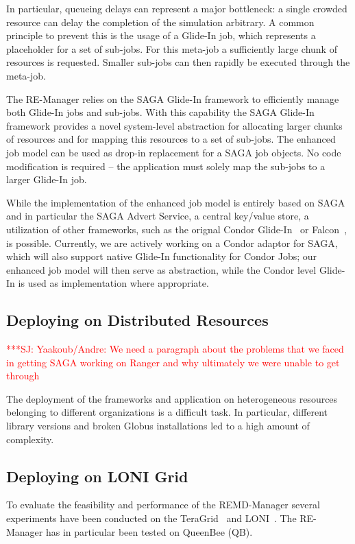 \documentclass[conference,final]{IEEEtran}
\newcommand{\jhanote}[1]{ {\textcolor{red} { ***SJ: #1 }}}
\newcommand{\jhanote}[1]{}
\begin{document}
In particular, queueing delays can represent a major bottleneck: a
single crowded resource can delay the completion of the simulation
arbitrary. A common principle to prevent this is the usage of a
Glide-In job, which represents a placeholder for a set of
sub-jobs. For this meta-job a sufficiently large chunk of resources is
requested. Smaller sub-jobs can then rapidly be executed through the
meta-job.

The RE-Manager relies on the SAGA Glide-In framework to efficiently
manage both Glide-In jobs and sub-jobs. With this capability the SAGA
Glide-In framework provides a novel system-level abstraction for
allocating larger chunks of resources and for mapping this resources
to a set of sub-jobs. The enhanced job model can be used as drop-in
replacement for a SAGA job objects. No code modification is required
-- the application must solely map the sub-jobs to a larger Glide-In
job.

While the implementation of the enhanced job model is entirely based
on SAGA and in particular the SAGA Advert Service, a central key/value
store, a utilization of other frameworks, such as the orignal Condor
Glide-In~\cite{citeulike:291860} or Falcon~\cite{1362680}, is
possible. Currently, we are actively working on a Condor adaptor for
SAGA, which will also support native Glide-In functionality for Condor
Jobs; our enhanced job model will then serve as abstraction, while the
Condor level Glide-In is used as implementation where appropriate.

\subsection{Deploying on Distributed Resources}

\jhanote{Yaakoub/Andre: We need a paragraph about the problems that we
  faced in getting SAGA working on Ranger and why ultimately we 
  were unable to get through}

The deployment of the frameworks and application on heterogeneous
resources belonging to different organizations is a difficult task. In
particular, different library versions and broken Globus installations
led to a high amount of complexity.


\subsection{Deploying on LONI Grid}

To evaluate the feasibility and performance of the REMD-Manager
several experiments have been conducted on the
TeraGrid~\cite{teragrid} and LONI~\cite{loni}.  The RE-Manager has in
particular been tested on QueenBee (QB).
\end{document}
